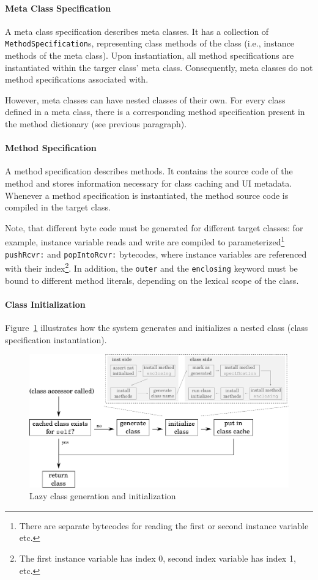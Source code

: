 \paragraph{Meta Class Specification}
A meta class specification describes meta classes. It has a collection of \texttt{MethodSpecification}s, representing class methods of the class (i.e., instance methods of the meta class). Upon instantiation, all method specifications are instantiated within the targer class' meta class. Consequently, meta classes do not method specifications associated with.

However, meta classes can have nested classes of their own. For every class defined in a meta class, there is a corresponding method specification present in the method dictionary (see previous paragraph).

\paragraph{Method Specification}
A method specification describes methods. It contains the source code of the method and stores information necessary for class caching and UI metadata. Whenever a method specification is instantiated, the method source code is compiled in the target class. 

Note, that different byte code must be generated for different target classes: for example, instance variable reads and write are compiled to parameterized\footnote{There are separate bytecodes for reading the first or second instance variable etc.} \texttt{pushRcvr:} and \texttt{popIntoRcvr:} bytecodes, where instance variables are referenced with their index\footnote{The first instance variable has index 0, second index variable has index 1, etc.}. In addition, the \texttt{outer} and the \texttt{enclosing} keyword must be bound to different method literals, depending on the lexical scope of the class.

\paragraph{Class Initialization}
Figure~\ref{fig:lazy_class_gen} illustrates how the system generates and initializes a nested class (class specification instantiation).

\begin{figure}
	\includegraphics[width=\textwidth]{lazy_class_gen.pdf}
	\centering
	\caption{Lazy class generation and initialization}
	\label{fig:lazy_class_gen}
\end{figure}

